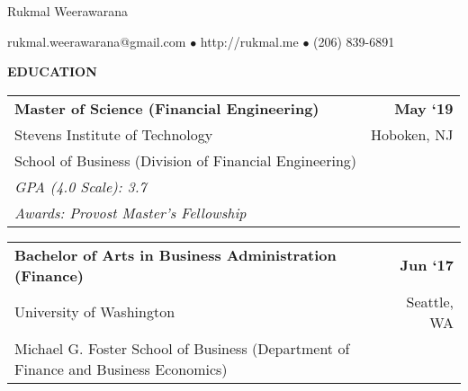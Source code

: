 \documentclass[10pt, letterpaper]{letter}
\newcommand{\highlightcolor}{RoyalBlue}
\newcommand{\sectionTitle}[1]{ \vspace{1em} \raggedright{ \color{\highlightcolor} \large \textbf{ \uppercase{ #1}}}}
\begin{document}
    \centerline{ \color{\highlightcolor} \huge Rukmal Weerawarana}

    \vspace{.5em}

    {\color{\highlightcolor} \centerline{rukmal.weerawarana@gmail.com $\bullet$ http://rukmal.me $\bullet$ (206) 839-6891} }

    \noindent{\rule{\linewidth}{.2em}}


    \sectionTitle{Education}

    
        \begin{tabularx}{\textwidth}{X r}
            \textbf{Master of Science (Financial Engineering)} & \textbf{
    May ‘19} \\
            \quad Stevens Institute of Technology & 
    Hoboken, 
        NJ \\
            \quad School of Business (Division of Financial Engineering) & \\
            
                \quad \textit{GPA (4.0 Scale): 3.7} & \\
            
            
                
                    
                        \quad \textit{Awards: 
    Provost Master's Fellowship} & \\
                    
                
            
        \end{tabularx}
    
        \begin{tabularx}{\textwidth}{X r}
            \textbf{Bachelor of Arts in Business Administration (Finance)} & \textbf{
    Jun ‘17} \\
            \quad University of Washington & 
    Seattle, 
        WA \\
            \quad Michael G. Foster School of Business (Department of Finance and Business Economics) & \\
            
            
        \end{tabularx}
    
\end{document}
